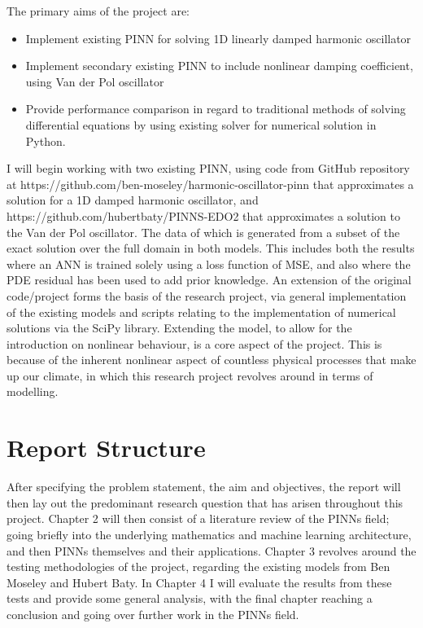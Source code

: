 \documentclass[12pt, openany]{book}
\begin{document}
The primary aims of the project are:

\begin{itemize}
    \item Implement existing PINN for solving 1D linearly damped harmonic oscillator
    \item Implement secondary existing PINN to include nonlinear damping coefficient, using Van der Pol oscillator
    \item Provide performance comparison in regard to traditional methods of solving differential equations by using existing solver for numerical solution in Python.
\end{itemize}

I will begin working with two existing PINN, using code from GitHub repository at https://github.com/ben-moseley/harmonic-oscillator-pinn that approximates a solution for a 1D damped harmonic oscillator, and https://github.com/hubertbaty/PINNS-EDO2 that approximates a solution to the Van der Pol oscillator. The data of which is generated from a subset of the exact solution over the full domain in both models. This includes both the results where an ANN is trained solely using a loss function of MSE, and also where the PDE residual has been used to add prior knowledge. An extension of the original code/project forms the basis of the research project, via general implementation of the existing models and scripts relating to the implementation of numerical solutions via the SciPy library. Extending the model, to allow for the introduction on nonlinear behaviour, is a core aspect of the project. This is because of the inherent nonlinear aspect of countless physical processes that make up our climate, in which this research project revolves around in terms of modelling.

\section{Report Structure}

After specifying the problem statement, the aim and objectives, the report will then lay out the predominant research question that has arisen throughout this project. Chapter 2 will then consist of a literature review of the PINNs field; going briefly into the underlying mathematics and machine learning architecture, and then PINNs themselves and their applications. Chapter 3 revolves around the testing methodologies of the project, regarding the existing models from Ben Moseley and Hubert Baty. In Chapter 4 I will evaluate the results from these tests and provide some general analysis, with the final chapter reaching a conclusion and going over further work in the PINNs field.
\end{document}
